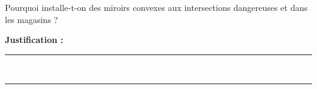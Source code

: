 Pourquoi installe-t-on des miroirs convexes aux intersections dangereuses et dans les magasins ?

\choices

\noindent\textbf{Justification :} \hrulefill \\[2.5ex]
\rule{\linewidth}{0.4pt} \\[2.5ex]
\rule{\linewidth}{0.4pt}
\vfill
